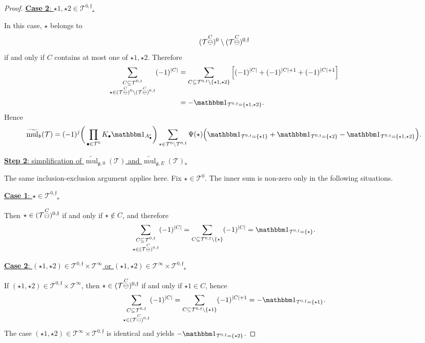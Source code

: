 \documentclass[a4paper,
11pt,  reqno]{amsart}
\makeatletter
\newcommand{\5}{\textup{V}}
\newcommand{\noi}{\noindent}
\newcommand{\ind}{\mathbbm 1}
\newcommand{\wt}{\widetilde}
\theoremstyle{remark}
\newcommand{\bul}{\bullet}
\newcommand{\TT}{\mathcal{T}}
\newcommand{\bfrak}{\mathfrak{b}}
\newcommand{\gfrak}{\mathfrak{g}}
\newcommand{\ff}{\mathfrak{f}}
\DeclareMathOperator{\mul}{mul}
\def\<#1>{\csname MH@symb@#1\endcsname}
\numberwithin{equation}{section}
\numberwithin{theorem}{section}
\makeatother
\begin{document}
\begin{proof}
\smallskip

\noi
\underline{\textbf{Case 2}: $\star1,\star2\in \TT^{0,\ff}$.}

In this case, $\star$ belongs to
\[
(\TT\overset{C}{\ominus}\<1>)^0\setminus (\TT\overset{C}{\ominus}\<1>)^{0,\ff}
\]
if and only if $C$ contains at most one of $\star1,\star2$. Therefore
\begin{align*}
\sum_{\substack{C\subseteq \TT^{0,\ff}\\ \star\in (\TT\overset{C}{\ominus}\<1>)^0\setminus (\TT\overset{C}{\ominus}\<1>)^{0,\ff}}}
(-1)^{|C|}
&=
\sum_{C\subseteq \TT^{0,\ff}\setminus\{\star1,\star2\}}
\Big[(-1)^{|C|}+(-1)^{|C|+1}+(-1)^{|C|+1}\Big]
\\
&=
-\ind_{\TT^{0,\ff}=\{\star1,\star2\}}.
\end{align*}
Hence
\begin{align}
\label{eq:mulb-nv-adapted}
\wt{\mul}_{\bfrak}(\TT)
=
(-1)^j
\bigg(\prod_{\bul\in \TT^0}K_\bul\ind_{A_\bul^c}\bigg)
\sum_{\star\in \TT^0\setminus \TT^{0,\ff}}
\Psi(\star)
\Big(
\ind_{\TT^{0,\ff}=\{\star1\}}
+\ind_{\TT^{0,\ff}=\{\star2\}}
-\ind_{\TT^{0,\ff}=\{\star1,\star2\}}
\Big).
\end{align}

\smallskip

\noi
\underline{\textbf{Step 2}: simplification of $\wt{\mul}_{\gfrak,0}(\TT)$ and $\wt{\mul}_{\gfrak,E}(\TT)$.}

The same inclusion-exclusion argument applies here. Fix $\star\in \TT^0$. The inner sum is non-zero only in the following situations.

\smallskip

\noi
\underline{\textbf{Case 1}: $\star\in \TT^{0,\ff}$.}

Then $\star\in (\TT\overset{C}{\ominus}\<1>)^{0,\ff}$ if and only if $\star\notin C$, and therefore
\[
\sum_{\substack{C\subseteq \TT^{0,\ff}\\ \star\in (\TT\overset{C}{\ominus}\<1>)^{0,\ff}}}
(-1)^{|C|}
=
\sum_{C\subseteq \TT^{0,\ff}\setminus\{\star\}}(-1)^{|C|}
=
\ind_{\TT^{0,\ff}=\{\star\}}.
\]

\smallskip

\noi
\underline{\textbf{Case 2}: $(\star1,\star2)\in \TT^{0,\ff}\times \TT^\infty$ or $(\star1,\star2)\in \TT^\infty\times \TT^{0,\ff}$.}

If $(\star1,\star2)\in \TT^{0,\ff}\times \TT^\infty$, then $\star\in (\TT\overset{C}{\ominus}\<1>)^{0,\ff}$ if and only if $\star1\in C$, hence
\[
\sum_{\substack{C\subseteq \TT^{0,\ff}\\ \star\in (\TT\overset{C}{\ominus}\<1>)^{0,\ff}}}
(-1)^{|C|}
=
\sum_{C\subseteq \TT^{0,\ff}\setminus\{\star1\}}(-1)^{|C|+1}
=
-\ind_{\TT^{0,\ff}=\{\star1\}}.
\]
The case $(\star1,\star2)\in \TT^\infty\times \TT^{0,\ff}$ is identical and yields
$-\ind_{\TT^{0,\ff}=\{\star2\}}$.


\end{proof}
\end{document}
